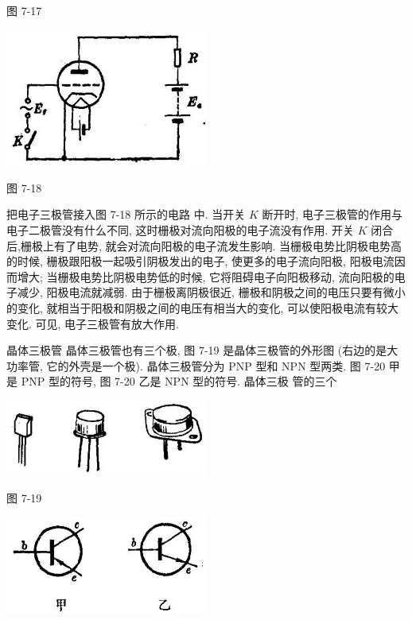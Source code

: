 \documentclass[10pt]{article}
\begin{document}
图 7-17

\begin{center}
\includegraphics[max width=0.5\textwidth]{images/01913056-1f15-74d8-9184-9aab52c9d66b_231_785691.jpg}
\end{center}

图 7-18

把电子三极管接入图 7-18 所示的电路 中. 当开关 \(K\) 断开时, 电子三极管的作用与电子二极管没有什么不同, 这时栅极对流向阳极的电子流没有作用. 开关 \(K\) 闭合后,栅极上有了电势, 就会对流向阳极的电子流发生影响. 当栅极电势比阴极电势高的时候, 栅极跟阳极一起吸引阴极发出的电子, 使更多的电子流向阳极, 阳极电流因而增大; 当栅极电势比阴极电势低的时候, 它将阻碍电子向阳极移动, 流向阳极的电子减少, 阳极电流就减弱. 由于栅极离阴极很近, 栅极和阴极之间的电压只要有微小的变化, 就相当于阳极和阴极之间的电压有相当大的变化, 可以使阳极电流有较大变化. 可见, 电子三极管有放大作用.

晶体三极管 晶体三极管也有三个极, 图 7-19 是晶体三极管的外形图 (右边的是大功率管, 它的外壳是一个极). 晶体三极管分为 PNP 型和 NPN 型两类. 图 7-20 甲是 PNP 型的符号, 图 7-20 乙是 NPN 型的符号. 晶体三极 管的三个

\begin{center}
\includegraphics[max width=0.5\textwidth]{images/01913056-1f15-74d8-9184-9aab52c9d66b_232_998314.jpg}
\end{center}

图 7-19

\begin{center}
\includegraphics[max width=0.5\textwidth]{images/01913056-1f15-74d8-9184-9aab52c9d66b_232_375366.jpg}
\end{center}
\end{document}
